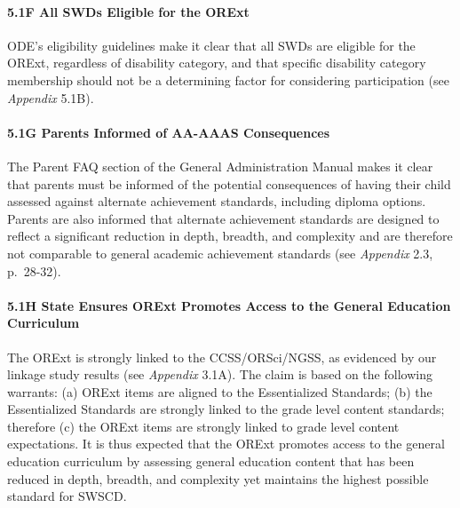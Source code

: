 \documentclass[]{article}
\let\oldparagraph\paragraph
\renewcommand{\paragraph}[1]{\oldparagraph{#1}\mbox{}}
\begin{document}
\hypertarget{f-all-swds-eligible-for-the-orext}{%
\paragraph{5.1F All SWDs Eligible for the
ORExt}\label{f-all-swds-eligible-for-the-orext}}

ODE's eligibility guidelines make it clear that all SWDs are eligible
for the ORExt, regardless of disability category, and that specific
disability category membership should not be a determining factor for
considering participation (see \emph{Appendix} 5.1B).

\hypertarget{g-parents-informed-of-aa-aaas-consequences}{%
\paragraph{5.1G Parents Informed of AA-AAAS
Consequences}\label{g-parents-informed-of-aa-aaas-consequences}}

The Parent FAQ section of the General Administration Manual makes it
clear that parents must be informed of the potential consequences of
having their child assessed against alternate achievement standards,
including diploma options. Parents are also informed that alternate
achievement standards are designed to reflect a significant reduction in
depth, breadth, and complexity and are therefore not comparable to
general academic achievement standards (see \emph{Appendix} 2.3,
p.~28-32).

\hypertarget{h-state-ensures-orext-promotes-access-to-the-general-education-curriculum}{%
\paragraph{5.1H State Ensures ORExt Promotes Access to the General
Education
Curriculum}\label{h-state-ensures-orext-promotes-access-to-the-general-education-curriculum}}

The ORExt is strongly linked to the CCSS/ORSci/NGSS, as evidenced by our
linkage study results (see \emph{Appendix} 3.1A). The claim is based on
the following warrants: (a) ORExt items are aligned to the Essentialized
Standards; (b) the Essentialized Standards are strongly linked to the
grade level content standards; therefore (c) the ORExt items are
strongly linked to grade level content expectations. It is thus expected
that the ORExt promotes access to the general education curriculum by
assessing general education content that has been reduced in depth,
breadth, and complexity yet maintains the highest possible standard for
SWSCD.
\end{document}
